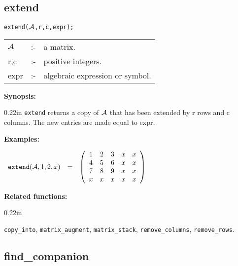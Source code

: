 \subsection{extend}


\hspace*{0.175in} {\tt extend(${\cal A}$,r,c,expr);}

\hspace*{0.1in} 
\begin{tabular}{l l l}
${\cal A}$ &:-& a matrix. \\
r,c        &:-& positive integers. \\
expr      &:-& algebraic expression or symbol.
\end{tabular}

{\bf Synopsis:} %

\begin{addtolength}{\leftskip}{0.22in}
                {\tt extend} returns a copy of ${\cal A}$ that has been 
                extended by r rows and c columns. The new entries are
                made equal to expr.

\end{addtolength}

{\bf Examples:}

\begin{flushleft}  
\hspace*{0.1in}
\begin{math}  
\begin{array}{ccc}
{\tt extend}({\cal A},1,2,x) & = & 
\left( \begin{array}{ccccc} 1 & 2 & 3 & x & x \\ 4 & 5 & 6 & x & x
\\ 7 & 8 & 9 & x & x \\ x & x & x & x & x 
\end{array} \right)
\end{array}
\end{math}  
\end{flushleft}

{\bf Related functions:} 

\begin{addtolength}{\leftskip}{0.22in}
\parbox[t]{0.95\linewidth}{{\tt copy\_into}, {\tt matrix\_augment}, 
{\tt matrix\_stack}, {\tt remove\_columns}, {\tt remove\_rows}.}

\end{addtolength}


\subsection{find\_companion}

